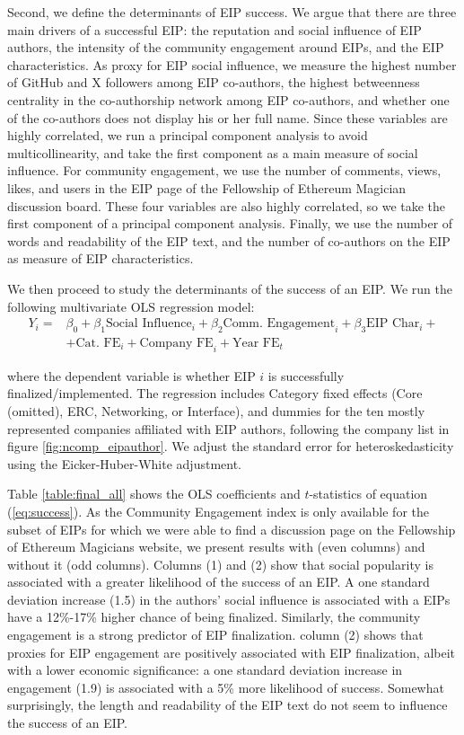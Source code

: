 \documentclass[No]{AEA}
\begin{document}
Second, we define the determinants of EIP success. We argue that there are three main drivers of a successful EIP: the reputation and social influence of EIP authors, the intensity of the community engagement around EIPs, and the EIP characteristics. As proxy for EIP social influence, we measure the highest number of GitHub and X followers among EIP co-authors, the highest betweenness centrality in the co-authorship network among EIP co-authors, and whether one of the co-authors does not display his or her full name. Since these variables are highly correlated, we run a principal component analysis to avoid multicollinearity, and take the first component as a main measure of social influence. For community engagement, we use the number of comments, views, likes, and users in the EIP page of the Fellowship of Ethereum Magician discussion board. These four variables are also highly correlated, so we take the first component of a principal component analysis. Finally, we use the number of words and readability of the EIP text, and the number of co-authors on the EIP as measure of EIP characteristics. 

We then proceed to study the determinants of the success of an EIP. We run the following multivariate OLS regression model:
\begin{equation}
\begin{split}   
  Y_i  =& \beta_0 + \beta_1 \text{Social Influence}_i + \beta_2 \text{Comm. Engagement}_i + \beta_{3} \text{EIP Char}_i +  \\ & + \text{Cat. FE}_i + \text{Company FE}_i  + \text{Year FE}_t   \label{eq:success}
\end{split}
\end{equation}

where the dependent variable is whether EIP $i$ is successfully finalized/implemented. The regression includes Category fixed effects (Core (omitted), ERC, Networking, or Interface), and dummies for the ten mostly represented companies affiliated with EIP authors, following the company list in figure \ref{fig:ncomp_eipauthor}. We adjust the standard error for heteroskedasticity using the Eicker-Huber-White adjustment. 

Table \ref{table:final_all} shows the OLS coefficients and $t$-statistics of equation (\ref{eq:success}). As the Community Engagement index is only available for the subset of EIPs for which we were able to find a discussion page on the Fellowship of Ethereum Magicians website, we present results with (even columns) and without it (odd columns). Columns (1) and (2) show that social popularity is associated with a greater likelihood of the success of an EIP. A one standard deviation increase (1.5) in the authors' social influence is associated with a EIPs have a 12\%-17\% higher chance of being finalized. Similarly, the community engagement is a strong predictor of EIP finalization. column (2) shows that proxies for EIP engagement are positively associated with EIP finalization, albeit with a lower economic significance: a one standard deviation increase in engagement (1.9) is associated with a 5\% more likelihood of success. Somewhat surprisingly, the length and readability of the EIP text do not seem to influence the success of an EIP. 
\end{document}
